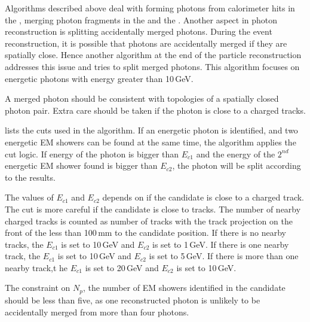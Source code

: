 Algorithms described above deal with forming photons from calorimeter hits in the \ECAL, merging photon fragments in the \ECAL and the \HCAL. Another aspect in photon reconstruction is splitting accidentally merged photons. During the event reconstruction, it is possible that photons are accidentally merged if they are spatially close. Hence another algorithm at the end of the particle reconstruction addresses this issue and tries to split merged photons. This algorithm focuses on energetic photons with energy greater than 10\,GeV.

A merged photon should be consistent with topologies of a spatially closed photon pair. Extra care should be taken if the photon is close to a charged tracks.


 lists the cuts used in the algorithm.  If an energetic photon is identified, and two energetic EM showers  can be found at the same time, the algorithm applies the cut logic. If energy of the photon is bigger than $E_{c1}$ and the energy of the $2^{nd}$ energetic EM shower found is bigger than $E_{c2}$, the photon will be split according to the \peakFinding results.

The values of $E_{c1}$ and $E_{c2}$ depends on if the candidate is close to a charged track. The cut is more careful if the candidate is close to tracks. The number of nearby charged tracks is counted as number of tracks with the track projection on the front of the \ECAL less than 100\,mm to the candidate position. If there is no nearby tracks, the $E_{c1}$ is set to 10\,GeV and $E_{c2}$ is set to 1\,GeV. If there is one nearby track, the $E_{c1}$ is set to 10\,GeV and $E_{c2}$ is set to 5\,GeV. If there is more than one nearby track,t he $E_{c1}$ is set to 20\,GeV and $E_{c2}$ is set to 10\,GeV.


The constraint on $N_{p}$, the number of EM showers identified in the candidate should be less than five, as one reconstructed photon is unlikely to be accidentally merged from more than four photons.


